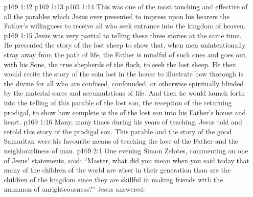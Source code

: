 \vs p169 1:12 
\vs p169 1:13 
\vs p169 1:14 \pc This was one of the most touching and effective of all the parables which Jesus ever presented to impress upon his hearers the Father’s willingness to receive all who seek entrance into the kingdom of heaven.
\vs p169 1:15 Jesus was very partial to telling these three stories at the same time. He presented the story of the lost sheep to show that, when men unintentionally stray away from the path of life, the Father is mindful of such  ones and goes out, with his Sons, the true shepherds of the flock, to seek the lost sheep. He then would recite the story of the coin lost in the house to illustrate how thorough is the divine  for all who are confused, confounded, or otherwise spiritually blinded by the material cares and accumulations of life. And then he would launch forth into the telling of this parable of the lost son, the reception of the returning prodigal, to show how complete is the  of the lost son into his Father’s house and heart.
\vs p169 1:16 Many, many times during his years of teaching, Jesus told and retold this story of the prodigal son. This parable and the story of the good Samaritan were his favourite means of teaching the love of the Father and the neighbourliness of man.
\vs p169 2:1 One evening Simon Zelotes, commenting on one of Jesus’ statements, said: “Master, what did you mean when you said today that many of the children of the world are wiser in their generation than are the children of the kingdom since they are skillful in making friends with the mammon of unrighteousness?” Jesus answered:

